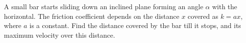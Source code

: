 \item A small bar starts sliding down an inclined plane forming an angle $\alpha$ with the horizontal. The friction coefficient depends on the distance $x$ covered as $k = ax$, where $a$ is a constant. Find the distance covered by the bar till it stops, and its maximum velocity over this distance.